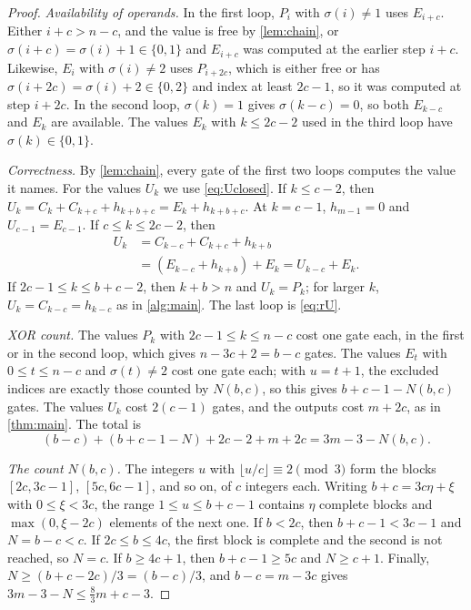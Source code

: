 \documentclass{ieeeaccess}
\theoremstyle{plain}
\theoremstyle{definition}
\begin{document}
\begin{proof}
\emph{Availability of operands.} In the first loop, $P_i$ with $\sigma(i)\ne1$
uses $E_{i+c}$. Either $i+c>n-c$, and the value is free by \cref{lem:chain}, or
$\sigma(i+c)=\sigma(i)+1\in\{0,1\}$ and $E_{i+c}$ was computed at the earlier
step $i+c$. Likewise, $E_i$ with $\sigma(i)\ne2$ uses $P_{i+2c}$, which is
either free or has $\sigma(i+2c)=\sigma(i)+2\in\{0,2\}$ and index at least
$2c-1$, so it was computed at step $i+2c$. In the second loop, $\sigma(k)=1$
gives $\sigma(k-c)=0$, so both $E_{k-c}$ and $E_k$ are available. The values
$E_k$ with $k\le 2c-2$ used in the third loop have $\sigma(k)\in\{0,1\}$.

\emph{Correctness.} By \cref{lem:chain}, every gate of the first two loops
computes the value it names. For the values $U_k$ we use \eqref{eq:Uclosed}.
If $k\le c-2$, then $U_k=C_k+C_{k+c}+h_{k+b+c}=E_k+h_{k+b+c}$. At $k=c-1$,
$h_{m-1}=0$ and $U_{c-1}=E_{c-1}$. If $c\le k\le 2c-2$, then
\begin{align*}
  U_k&=C_{k-c}+C_{k+c}+h_{k+b}\\
     &=(E_{k-c}+h_{k+b})+E_k
      =U_{k-c}+E_k .
\end{align*}
If $2c-1\le k\le b+c-2$, then $k+b>n$ and $U_k=P_k$; for larger $k$,
$U_k=C_{k-c}=h_{k-c}$ as in \cref{alg:main}. The last loop is \eqref{eq:rU}.

\emph{XOR count.} The values $P_k$ with $2c-1\le k\le n-c$ cost one gate each,
in the first or in the second loop, which gives $n-3c+2=b-c$ gates. The values
$E_t$ with $0\le t\le n-c$ and $\sigma(t)\ne2$ cost one gate each; with $u=t+1$,
the excluded indices are exactly those counted by $N(b,c)$, so this gives
$b+c-1-N(b,c)$ gates. The values $U_k$ cost $2(c-1)$ gates, and the outputs
cost $m+2c$, as in \cref{thm:main}. The total is
\[
  (b-c)+(b+c-1-N)+2c-2+m+2c=3m-3-N(b,c).
\]

\emph{The count $N(b,c)$.} The integers $u$ with $\lfloor u/c\rfloor\equiv2
\pmod3$ form the blocks $[2c,3c-1]$, $[5c,6c-1]$, and so on, of $c$ integers
each. Writing $b+c=3c\eta+\xi$ with $0\le\xi<3c$, the range $1\le u\le b+c-1$
contains $\eta$ complete blocks and $\max(0,\xi-2c)$ elements of the next one.
If $b<2c$, then $b+c-1<3c-1$ and $N=b-c<c$. If $2c\le b\le4c$, the first
block is complete and the second is not reached, so $N=c$. If $b\ge4c+1$, then
$b+c-1\ge5c$ and $N\ge c+1$. Finally, $N\ge(b+c-2c)/3=(b-c)/3$, and
$b-c=m-3c$ gives $3m-3-N\le\tfrac83m+c-3$.
\end{proof}
\end{document}
